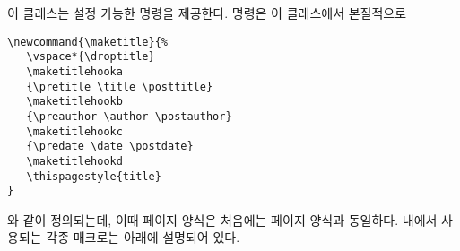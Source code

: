 이 클래스는 설정 가능한 \cmd{\maketitle} 명령을 제공한다.
\cmd{\maketitle} 명령은 이 클래스에서 본질적으로
\begin{verbatim}
\newcommand{\maketitle}{%
   \vspace*{\droptitle}
   \maketitlehooka
   {\pretitle \title \posttitle}
   \maketitlehookb
   {\preauthor \author \postauthor}
   \maketitlehookc
   {\predate \date \postdate}
   \maketitlehookd
   \thispagestyle{title}
}
\end{verbatim}
와 같이 정의되는데, 이때  페이지 양식은 처음에는 
페이지 양식과 동일하다.
\cmd{\maketitle} 내에서 사용되는 각종 매크로는 아래에 설명되어 있다.


